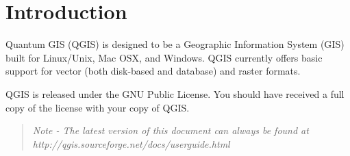 \section{Introduction}
Quantum GIS (QGIS) is designed to be a Geographic Information System
(GIS) built for Linux/Unix, Mac OSX, and Windows. QGIS currently offers basic support for
vector (both disk-based and database) and raster formats. 

QGIS is released under the GNU Public License. You should have received a full copy of the license with your copy of QGIS.
\begin{quote}
\begin{singlespace}
\textsl{Note - The latest version of this document can always be found at\\
http://qgis.sourceforge.net/docs/userguide.html }
\end{singlespace}
\end{quote}
